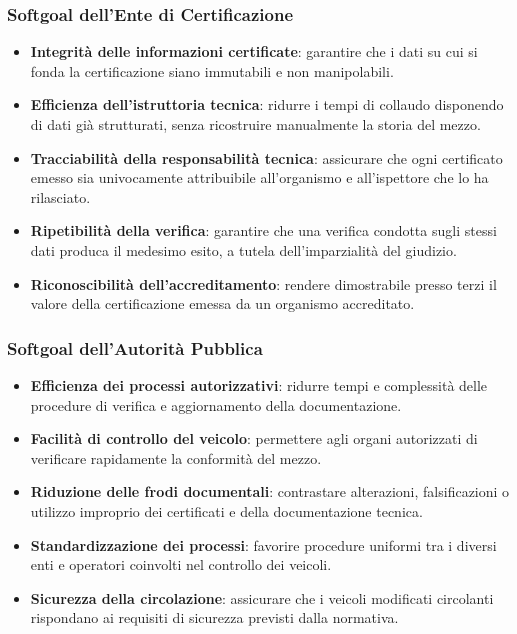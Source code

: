\subsubsection*{Softgoal dell'Ente di Certificazione}

\begin{itemize}
    \item \textbf{Integrit\`a delle informazioni certificate}: garantire che i dati su cui si fonda la certificazione siano immutabili e non manipolabili.
    \item \textbf{Efficienza dell'istruttoria tecnica}: ridurre i tempi di collaudo disponendo di dati gi\`a strutturati, senza ricostruire manualmente la storia del mezzo.
    \item \textbf{Tracciabilit\`a della responsabilit\`a tecnica}: assicurare che ogni certificato emesso sia univocamente attribuibile all'organismo e all'ispettore che lo ha rilasciato.
    \item \textbf{Ripetibilit\`a della verifica}: garantire che una verifica condotta sugli stessi dati produca il medesimo esito, a tutela dell'imparzialit\`a del giudizio.
    \item \textbf{Riconoscibilit\`a dell'accreditamento}: rendere dimostrabile presso terzi il valore della certificazione emessa da un organismo accreditato.
\end{itemize}

\subsubsection*{Softgoal dell'Autorit\`a Pubblica}

\begin{itemize}
    \item \textbf{Efficienza dei processi autorizzativi}: ridurre tempi e complessit\`a delle procedure di verifica e aggiornamento della documentazione.
    \item \textbf{Facilit\`a di controllo del veicolo}: permettere agli organi autorizzati di verificare rapidamente la conformit\`a del mezzo.
    \item \textbf{Riduzione delle frodi documentali}: contrastare alterazioni, falsificazioni o utilizzo improprio dei certificati e della documentazione tecnica.
    \item \textbf{Standardizzazione dei processi}: favorire procedure uniformi tra i diversi enti e operatori coinvolti nel controllo dei veicoli.
    \item \textbf{Sicurezza della circolazione}: assicurare che i veicoli modificati circolanti rispondano ai requisiti di sicurezza previsti dalla normativa.
\end{itemize}

